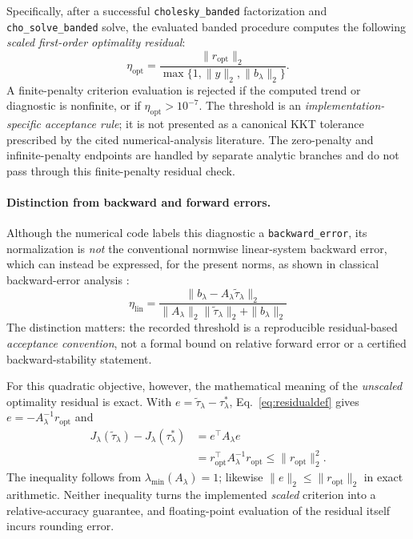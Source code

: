Specifically, after a successful
\texttt{cholesky\_banded} factorization and
\texttt{cho\_solve\_banded} solve, the evaluated banded
procedure computes the following \emph{scaled first-order
optimality residual}:
\begin{equation}\label{eq:kkt}
\boxed{\quad
\eta_{\mathrm{opt}}=
\frac{\|r_{\mathrm{opt}}\|_2}
{\max\{1,\|y\|_2,\|b_\lambda\|_2\}}.
\quad}
\end{equation}
A finite-penalty criterion evaluation is rejected if the
computed trend or diagnostic is nonfinite, or if
$\eta_{\mathrm{opt}}>10^{-7}$. The threshold is an
\emph{implementation-specific acceptance rule}; it is
not presented as a canonical KKT tolerance prescribed by
the cited numerical-analysis literature. The zero-penalty
and infinite-penalty endpoints are handled by separate
analytic branches and do not pass through this finite-penalty
residual check.

\paragraph{Distinction from backward and forward errors.}
Although the numerical code labels this diagnostic a
\texttt{backward\_error}, its normalization is \emph{not}
the conventional normwise linear-system backward error,
which can instead be expressed, for the present norms, as
shown in classical backward-error analysis \citep{higham2002accuracy}:
\begin{equation}\label{eq:standardbackward}
\eta_{\mathrm{lin}}=
\frac{\|b_\lambda-A_\lambda\widetilde\tau_\lambda\|_2}
{\|A_\lambda\|_2\|\widetilde\tau_\lambda\|_2+
 \|b_\lambda\|_2}
\end{equation}
The distinction matters:
the recorded threshold is a reproducible residual-based
\emph{acceptance convention}, not a formal bound on
relative forward error or a certified backward-stability
statement.

For this quadratic objective, however, the mathematical
meaning of the \emph{unscaled} optimality residual is exact.
With $e=\widetilde\tau_\lambda-\tau_\lambda^*$,
Eq.~\eqref{eq:residualdef} gives
$e=-A_\lambda^{-1}r_{\mathrm{opt}}$ and
\begin{equation}\label{eq:optimalitygap}
\begin{split}
J_\lambda(\widetilde\tau_\lambda)-J_\lambda(\tau_\lambda^*)
&=e^\top A_\lambda e\\
&=r_{\mathrm{opt}}^\top A_\lambda^{-1}r_{\mathrm{opt}}
\leq\|r_{\mathrm{opt}}\|_2^2.
\end{split}
\end{equation}
The inequality follows from
$\lambda_{\min}(A_\lambda)=1$; likewise
$\|e\|_2\leq\|r_{\mathrm{opt}}\|_2$ in exact arithmetic.
Neither inequality turns the implemented \emph{scaled}
criterion into a relative-accuracy guarantee, and
floating-point evaluation of the residual itself incurs
rounding error.

